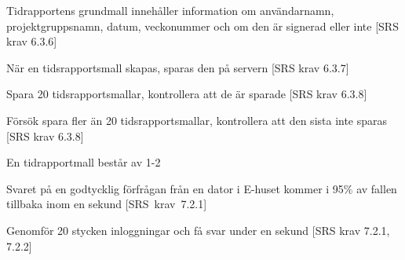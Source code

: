 \documentclass[a4paper]{article}
\begin{document}
\begin{appendices}
\begin{ST}
\item
Tidrapportens grundmall innehåller information om användarnamn, projektgruppsnamn, datum, veckonummer och om den är signerad eller inte [SRS krav 6.3.6]

\item
När en tidsrapportsmall skapas, sparas den på servern [SRS krav 6.3.7]

\item
Spara 20 tidsrapportsmallar, kontrollera att de är sparade [SRS krav 6.3.8]

\item
Försök spara fler än 20 tidsrapportsmallar, kontrollera att den sista inte sparas [SRS krav 6.3.8]

\item
En tidrapportmall består av 1-2


\item
Svaret på en godtycklig förfrågan från en dator i E-huset kommer i 95\% av fallen tillbaka inom en sekund [SRS~krav~7.2.1]

\item
Genomför 20 stycken inloggningar och få svar under en sekund [SRS krav 7.2.1, 7.2.2]

\end{ST}




\end{appendices}

\newpage
\end{document}
